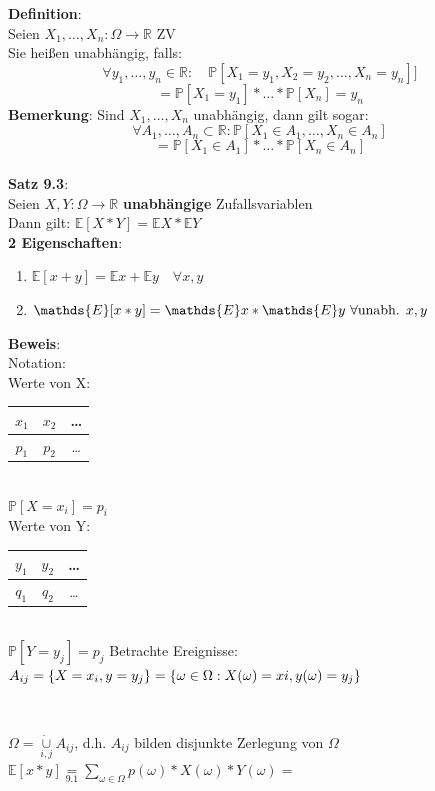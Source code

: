\textbf{Definition}:\\
Seien $X_1,\dots,X_n : \Omega \rightarrow\mathds{R}$ ZV\\
Sie heißen unabhängig, falls: 
$$\forall y_1,\dots,y_n \in \mathds{R}: \quad \mathds{P}[X_1 = y_1,X_2 =y_2,\dots,X_n=y_n]]$$
$$=\mathds{P}[X_1=y_1]*\dots*\mathds{P}[X_n]=y_n$$
\textbf{Bemerkung}: Sind $X_1,\dots,X_n$ unabhängig, dann gilt sogar:
$$\forall A_1,\dots,A_n \subset \mathds{R}: \mathds{P}[X_1 \in A_1,\dots,X_n \in A_n]$$
$$=\mathds{P}[X_1 \in A_1]*\dots*\mathds{P}[X_n \in A_n]$$\medskip\\
\textbf{Satz 9.3}:\\
Seien $X,Y :\Omega \rightarrow \mathds{R} $ \textbf{unabhängige} Zufallsvariablen\\
Dann gilt: $\mathds{E}[X*Y]= \mathds{E}X*\mathds{E}Y$\medskip\\
\textbf{2 Eigenschaften}:
\begin{enumerate}
	\item $\mathds{E}[x+y] = \mathds{E}x+\mathds{E}y \quad \forall x,y$
	\item $ \mathds{E}[x*y] = \mathds{E}x*\mathds{E}\text{$ y $ } \forall \text{unabh. } x,y$
\end{enumerate}
\textbf{Beweis}:\\
Notation:\\
Werte von X: 
\begin{tabular}{|c|c|c|}
	$x_1$&$x_2$&\dots\\\hline
	$p_1$&$p_2$&\dots
\end{tabular} \\
$\mathds{P}[X=x_i]=p_i$\smallskip\\
Werte von Y: 
\begin{tabular}{|c|c|c|}
	$y_1$&$y_2$&\dots\\\hline
	$q_1$&$q_2$&\dots
\end{tabular}\\
$\mathds{P}[Y=y_j]=p_j$\newpage
Betrachte Ereignisse: $A_{ij}=\{X=x_i, y=y_j\}\smallskip\\=\{\omega \in \Omega : X(\omega)=xi,y(\omega)=y_j\}$\medskip\\
\begin{center}
	\\
\end{center}
$\Omega = \underset{i,j}{\dot\cup}A_{ij}$, d.h. $A_{ij}$ bilden disjunkte Zerlegung von $\Omega$\medskip\\
$\mathds{E}[x*y] \underset{9.1}{=} \sum_{\omega\in \Omega} p(\omega)*X(\omega)*Y(\omega)=$\medskip\\
